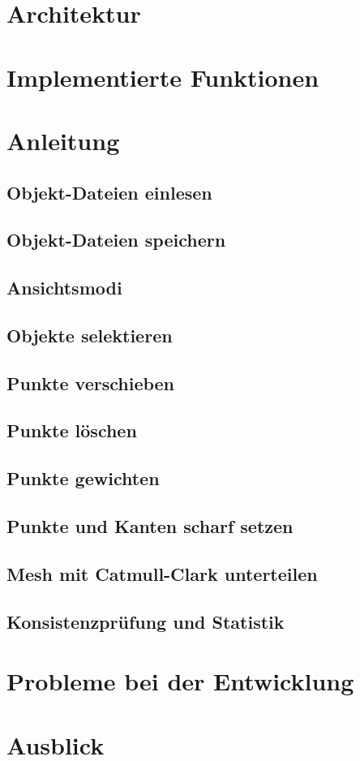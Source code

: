 \newpage
\section{Architektur}



\section{Implementierte Funktionen}
\section{Anleitung}
\subsection{Objekt-Dateien einlesen}
\subsection{Objekt-Dateien speichern}
\subsection{Ansichtsmodi}
\subsection{Objekte selektieren}
\subsection{Punkte verschieben}
\subsection{Punkte löschen}
\subsection{Punkte gewichten}
\subsection{Punkte und Kanten scharf setzen}
\subsection{Mesh mit Catmull-Clark unterteilen}
\subsection{Konsistenzprüfung und Statistik}
\section{Probleme bei der Entwicklung}
\section{Ausblick}
\label{chap:Ausblick}